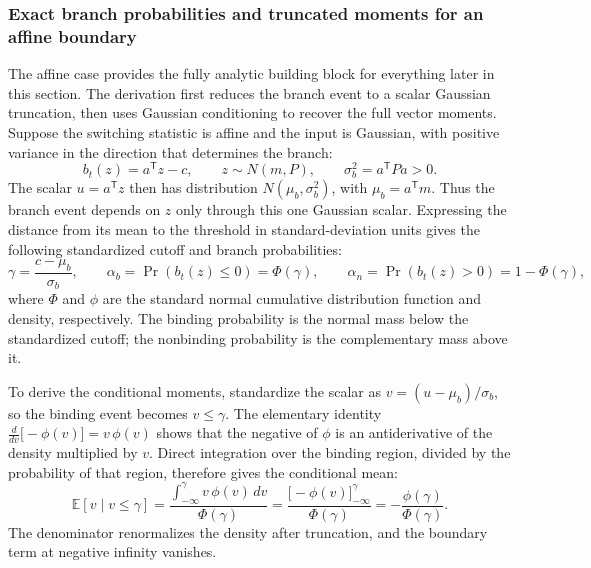 \documentclass[11pt]{article}
\begin{document}
\subsubsection{Exact branch probabilities and truncated moments for an
affine boundary}
\label{sec:ukf-truncmoments}

The affine case provides the fully analytic building block for everything later in this section. The derivation first reduces the branch event to a scalar Gaussian truncation, then uses Gaussian conditioning to recover the full vector moments. Suppose the switching statistic is affine and the input is Gaussian, with positive variance in the direction that determines the branch:
\begin{equation}\label{eq:21}
 b_t(z)=a^{\mathsf T}z-c,
 \qquad z\sim N(m,P),
 \qquad \sigma_b^2=a^{\mathsf T}Pa>0 .
\end{equation}
The scalar $u=a^{\mathsf T}z$ then has distribution $N(\mu_b,\sigma_b^2)$, with $\mu_b=a^{\mathsf T}m$. Thus the branch event depends on $z$ only through this one Gaussian scalar. Expressing the distance from its mean to the threshold in standard-deviation units gives the following standardized cutoff and branch probabilities:
\begin{equation}\label{eq:22}
 \gamma=\frac{c-\mu_b}{\sigma_b},
 \qquad
 \alpha_b=\Pr(b_t(z)\leq0)=\Phi(\gamma),
 \qquad
 \alpha_n=\Pr(b_t(z)>0)=1-\Phi(\gamma),
\end{equation}
where $\Phi$ and $\phi$ are the standard normal cumulative distribution function and density, respectively. The binding probability is the normal mass below the standardized cutoff; the nonbinding probability is the complementary mass above it.

To derive the conditional moments, standardize the scalar as $v=(u-\mu_b)/\sigma_b$, so the binding event becomes $v\leq\gamma$. The elementary identity $\frac{d}{dv}\bigl[-\phi(v)\bigr]=v\,\phi(v)$ shows that the negative of $\phi$ is an antiderivative of the density multiplied by $v$. Direct integration over the binding region, divided by the probability of that region, therefore gives the conditional mean:
\begin{equation}\label{eq:23}
 \mathbb E[v\mid v\leq\gamma]
 =\frac{\int_{-\infty}^{\gamma}v\,\phi(v)\,dv}{\Phi(\gamma)}
 =\frac{\bigl[-\phi(v)\bigr]_{-\infty}^{\gamma}}{\Phi(\gamma)}
 =-\frac{\phi(\gamma)}{\Phi(\gamma)}.
\end{equation}
The denominator renormalizes the density after truncation, and the boundary term at negative infinity vanishes.
\end{document}
